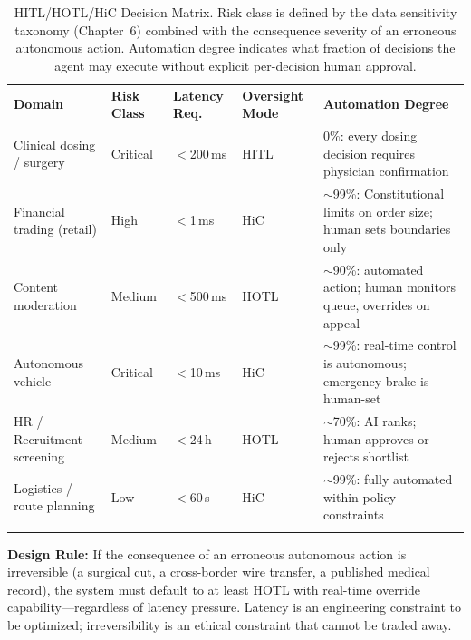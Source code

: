 \begin{table}[ht]
\centering
\caption{HITL/HOTL/HiC Decision Matrix. Risk class is defined by the data sensitivity taxonomy (Chapter~6) combined with the consequence severity of an erroneous autonomous action. Automation degree indicates what fraction of decisions the agent may execute without explicit per-decision human approval.}
\label{tab:hitl_decision_matrix}
\renewcommand{\arraystretch}{1.3}
\begin{tabular}{p{2.5cm} p{2.2cm} p{2.2cm} p{2.5cm} p{3.0cm}}
\hline\noalign{\smallskip}
\textbf{Domain} & \textbf{Risk Class} & \textbf{Latency Req.} & \textbf{Oversight Mode} & \textbf{Automation Degree} \\
\noalign{\smallskip}\svhline\noalign{\smallskip}
Clinical dosing / surgery & \cellcolor{costhigh}Critical & $<$200\,ms & HITL & 0\%: every dosing decision requires physician confirmation \\[4pt]
Financial trading (retail) & \cellcolor{costhigh}High & $<$1\,ms & HiC & $\sim$99\%: Constitutional limits on order size; human sets boundaries only \\[4pt]
Content moderation & \cellcolor{costmed}Medium & $<$500\,ms & HOTL & $\sim$90\%: automated action; human monitors queue, overrides on appeal \\[4pt]
Autonomous vehicle & \cellcolor{costhigh}Critical & $<$10\,ms & HiC & $\sim$99\%: real-time control is autonomous; emergency brake is human-set \\[4pt]
HR / Recruitment screening & \cellcolor{costmed}Medium & $<$24\,h & HOTL & $\sim$70\%: AI ranks; human approves or rejects shortlist \\[4pt]
Logistics / route planning & \cellcolor{costlow}Low & $<$60\,s & HiC & $\sim$99\%: fully automated within policy constraints \\
\noalign{\smallskip}\hline\noalign{\smallskip}
\end{tabular}
\end{table}

\begin{svgraybox}
\textbf{Design Rule:} If the consequence of an erroneous autonomous action is irreversible (a surgical cut, a cross-border wire transfer, a published medical record), the system must default to at least HOTL with real-time override capability---regardless of latency pressure. Latency is an engineering constraint to be optimized; irreversibility is an ethical constraint that cannot be traded away.
\end{svgraybox}

